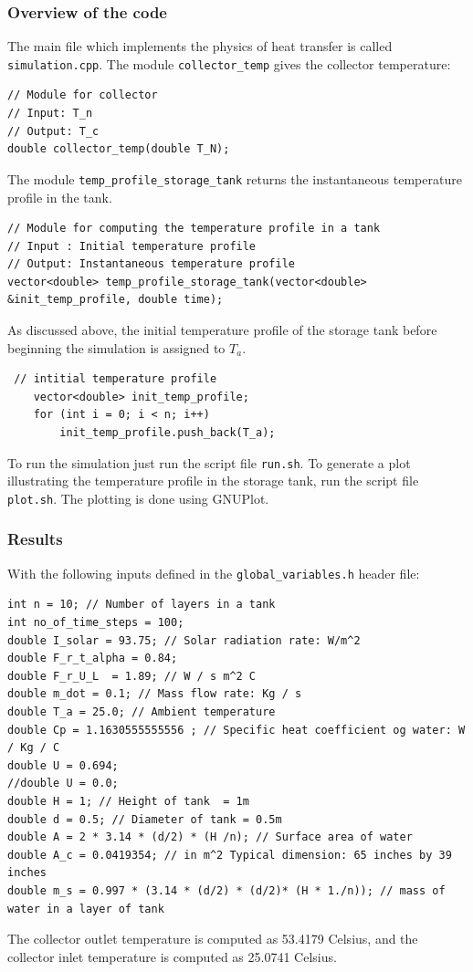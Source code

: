 \documentclass{article}
\begin{document}
\subsubsection*{Overview of the code}
The main file which implements the physics of heat transfer is called \texttt{simulation.cpp}. The module \texttt{collector\_temp} gives the collector temperature:
\begin{verbatim}
// Module for collector
// Input: T_n
// Output: T_c
double collector_temp(double T_N);
\end{verbatim}
The module \texttt{temp\_profile\_storage\_tank} returns the instantaneous temperature profile in the tank.
\begin{verbatim}
// Module for computing the temperature profile in a tank
// Input : Initial temperature profile
// Output: Instantaneous temperature profile
vector<double> temp_profile_storage_tank(vector<double> &init_temp_profile, double time);
\end{verbatim}
As discussed above, the initial temperature profile of the storage tank before beginning the simulation is assigned to $T_a$.
\begin{verbatim}
 // intitial temperature profile
    vector<double> init_temp_profile;
    for (int i = 0; i < n; i++)
        init_temp_profile.push_back(T_a);
\end{verbatim}
To run the simulation just run the script file \texttt{run.sh}. To generate a plot illustrating the temperature profile in the storage tank, run the script file \texttt{plot.sh}. The plotting is done using GNUPlot.


\subsubsection*{Results}
With the following inputs defined in the \texttt{global\_variables.h} header file:
\begin{verbatim}
int n = 10; // Number of layers in a tank
int no_of_time_steps = 100;
double I_solar = 93.75; // Solar radiation rate: W/m^2
double F_r_t_alpha = 0.84; 
double F_r_U_L  = 1.89; // W / s m^2 C
double m_dot = 0.1; // Mass flow rate: Kg / s
double T_a = 25.0; // Ambient temperature
double Cp = 1.1630555555556 ; // Specific heat coefficient og water: W / Kg / C
double U = 0.694;
//double U = 0.0;
double H = 1; // Height of tank  = 1m
double d = 0.5; // Diameter of tank = 0.5m
double A = 2 * 3.14 * (d/2) * (H /n); // Surface area of water
double A_c = 0.0419354; // in m^2 Typical dimension: 65 inches by 39 inches
double m_s = 0.997 * (3.14 * (d/2) * (d/2)* (H * 1./n)); // mass of water in a layer of tank
\end{verbatim}
The collector outlet temperature is computed as 53.4179 Celsius, and the collector inlet temperature is computed as  25.0741 Celsius.
\end{document}
